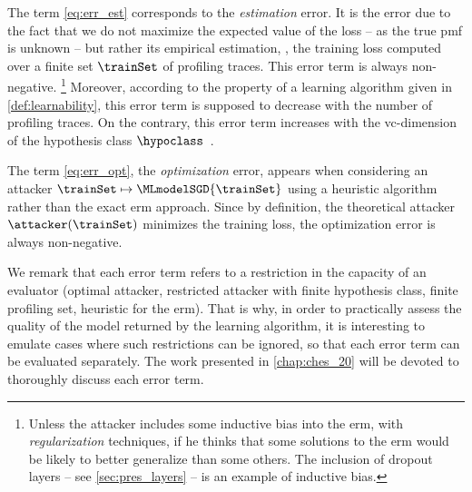 The term \eqref{eq:err_est} corresponds to the \textit{estimation} error.
It is the error due to the fact that we do not maximize the expected value of the loss -- as the true \gls{pmf} is unknown -- but rather its empirical estimation, \ie{}, the training loss computed over a finite set \(\trainSet\) of profiling traces.
This error term is always non-negative.%
\footnote{
	Unless the attacker includes some inductive bias into the \gls{erm}, \eg{} with \emph{regularization} techniques, if he thinks that some solutions to the \gls{erm} would be likely to better generalize than some others.
	The inclusion of dropout layers -- see \autoref{sec:pres_layers} -- is an example of inductive bias.
}
Moreover, according to the property of a learning algorithm given in \autoref{def:learnability}, this error term is supposed to decrease with the number of profiling traces.
On the contrary, this error term increases with the \gls{vc}-dimension of the hypothesis class \(\hypoclass\)~\cite{vapnik_overview_1999}.

The term \eqref{eq:err_opt}, \aka{} the \textit{optimization} error, appears when considering an attacker \(\trainSet \mapsto \MLmodelSGD{\trainSet}\) using a heuristic algorithm rather than the exact \gls{erm} approach.
Since by definition, the theoretical attacker \(\attacker(\trainSet)\) minimizes the training loss, the optimization error is always non-negative.

We remark that each error term refers to a restriction in the capacity of an evaluator (optimal attacker, restricted attacker with finite hypothesis class, finite profiling set, heuristic for the \gls{erm}).
That is why, in order to practically assess the quality of the model returned by the learning algorithm, it is interesting to emulate cases where such restrictions can be ignored, so that each error term can be evaluated separately.
The work presented in \autoref{chap:ches_20} will be devoted to thoroughly discuss  each error term.